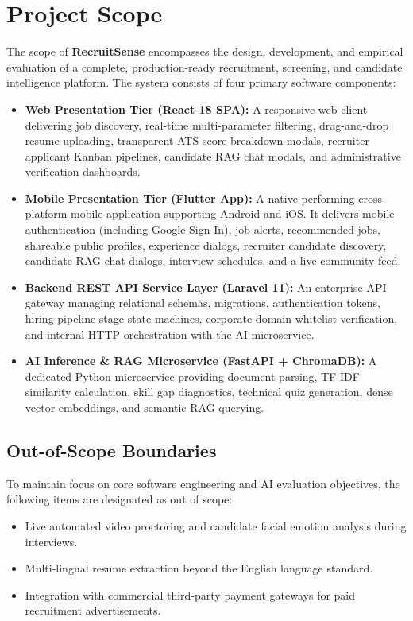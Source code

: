 \section{Project Scope}
The scope of \textbf{RecruitSense} encompasses the design, development, and empirical evaluation of a complete, production-ready recruitment, screening, and candidate intelligence platform. The system consists of four primary software components:

\begin{itemize}
    \item \textbf{Web Presentation Tier (React 18 SPA):} A responsive web client delivering job discovery, real-time multi-parameter filtering, drag-and-drop resume uploading, transparent ATS score breakdown modals, recruiter applicant Kanban pipelines, candidate RAG chat modals, and administrative verification dashboards.
    \item \textbf{Mobile Presentation Tier (Flutter App):} A native-performing cross-platform mobile application supporting Android and iOS. It delivers mobile authentication (including Google Sign-In), job alerts, recommended jobs, shareable public profiles, experience dialogs, recruiter candidate discovery, candidate RAG chat dialogs, interview schedules, and a live community feed.
    \item \textbf{Backend REST API Service Layer (Laravel 11):} An enterprise API gateway managing relational schemas, migrations, authentication tokens, hiring pipeline stage state machines, corporate domain whitelist verification, and internal HTTP orchestration with the AI microservice.
    \item \textbf{AI Inference \& RAG Microservice (FastAPI + ChromaDB):} A dedicated Python microservice providing document parsing, TF-IDF similarity calculation, skill gap diagnostics, technical quiz generation, dense vector embeddings, and semantic RAG querying.
\end{itemize}

\subsection*{Out-of-Scope Boundaries}
To maintain focus on core software engineering and AI evaluation objectives, the following items are designated as out of scope:
\begin{itemize}
    \item Live automated video proctoring and candidate facial emotion analysis during interviews.
    \item Multi-lingual resume extraction beyond the English language standard.
    \item Integration with commercial third-party payment gateways for paid recruitment advertisements.
\end{itemize}

